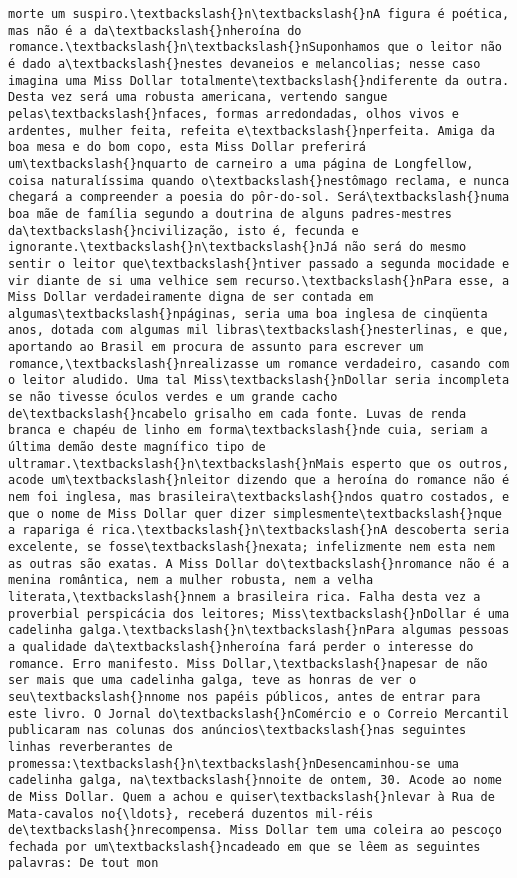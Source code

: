 \documentclass[11pt]{article}
\begin{document}
\begin{Verbatim}[commandchars=\\\{\}]
morte um suspiro.\textbackslash{}n\textbackslash{}nA figura é poética, mas não é a da\textbackslash{}nheroína do romance.\textbackslash{}n\textbackslash{}nSuponhamos que o leitor não é dado a\textbackslash{}nestes devaneios e melancolias; nesse caso imagina uma Miss Dollar totalmente\textbackslash{}ndiferente da outra. Desta vez será uma robusta americana, vertendo sangue pelas\textbackslash{}nfaces, formas arredondadas, olhos vivos e ardentes, mulher feita, refeita e\textbackslash{}nperfeita. Amiga da boa mesa e do bom copo, esta Miss Dollar preferirá um\textbackslash{}nquarto de carneiro a uma página de Longfellow, coisa naturalíssima quando o\textbackslash{}nestômago reclama, e nunca chegará a compreender a poesia do pôr-do-sol. Será\textbackslash{}numa boa mãe de família segundo a doutrina de alguns padres-mestres da\textbackslash{}ncivilização, isto é, fecunda e ignorante.\textbackslash{}n\textbackslash{}nJá não será do mesmo sentir o leitor que\textbackslash{}ntiver passado a segunda mocidade e vir diante de si uma velhice sem recurso.\textbackslash{}nPara esse, a Miss Dollar verdadeiramente digna de ser contada em algumas\textbackslash{}npáginas, seria uma boa inglesa de cinqüenta anos, dotada com algumas mil libras\textbackslash{}nesterlinas, e que, aportando ao Brasil em procura de assunto para escrever um romance,\textbackslash{}nrealizasse um romance verdadeiro, casando com o leitor aludido. Uma tal Miss\textbackslash{}nDollar seria incompleta se não tivesse óculos verdes e um grande cacho de\textbackslash{}ncabelo grisalho em cada fonte. Luvas de renda branca e chapéu de linho em forma\textbackslash{}nde cuia, seriam a última demão deste magnífico tipo de ultramar.\textbackslash{}n\textbackslash{}nMais esperto que os outros, acode um\textbackslash{}nleitor dizendo que a heroína do romance não é nem foi inglesa, mas brasileira\textbackslash{}ndos quatro costados, e que o nome de Miss Dollar quer dizer simplesmente\textbackslash{}nque a rapariga é rica.\textbackslash{}n\textbackslash{}nA descoberta seria excelente, se fosse\textbackslash{}nexata; infelizmente nem esta nem as outras são exatas. A Miss Dollar do\textbackslash{}nromance não é a menina romântica, nem a mulher robusta, nem a velha literata,\textbackslash{}nnem a brasileira rica. Falha desta vez a proverbial perspicácia dos leitores; Miss\textbackslash{}nDollar é uma cadelinha galga.\textbackslash{}n\textbackslash{}nPara algumas pessoas a qualidade da\textbackslash{}nheroína fará perder o interesse do romance. Erro manifesto. Miss Dollar,\textbackslash{}napesar de não ser mais que uma cadelinha galga, teve as honras de ver o seu\textbackslash{}nnome nos papéis públicos, antes de entrar para este livro. O Jornal do\textbackslash{}nComércio e o Correio Mercantil publicaram nas colunas dos anúncios\textbackslash{}nas seguintes linhas reverberantes de promessa:\textbackslash{}n\textbackslash{}nDesencaminhou-se uma cadelinha galga, na\textbackslash{}nnoite de ontem, 30. Acode ao nome de Miss Dollar. Quem a achou e quiser\textbackslash{}nlevar à Rua de Mata-cavalos no{\ldots}, receberá duzentos mil-réis de\textbackslash{}nrecompensa. Miss Dollar tem uma coleira ao pescoço fechada por um\textbackslash{}ncadeado em que se lêem as seguintes palavras: De tout mon 
\end{Verbatim}
\end{document}
